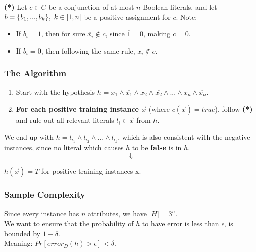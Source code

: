 \documentclass{article}
\begin{document}
	\noindent
	\textbf{(*)} Let ${c \in C}$ be a conjunction of at most ${n}$ Boolean literals, and let ${b = \{b_1,...,b_k\}, \thickspace k \in [1,n]}$ be a positive assignment for ${c}$. Note:
	\begin{itemize}
		\item If ${b_i = 1}$, then for sure ${\overline{x_i} \not \in c}$, since ${\overline{1} = 0}$, making ${c = 0}$.
		\item If ${b_i = 0}$, then following the same rule, ${x_i \not \in c}$.
	\end{itemize}
	
	\subsubsection*{The Algorithm}
	\begin{enumerate}
		\item Start with the hypothesis ${h = x_1\land \overline{x_1}\land x_2 \land \overline{x_2}\land ... \land x_n \land \overline{x_n}}$.
		
		\item \textbf{For each positive training instance ${\overrightarrow{x}}$} (where ${c(\overrightarrow{x}) = true}$), follow \textbf{(*)} and rule out all relevant literals ${l_i \in \overrightarrow{x}}$ from ${h}$.
	\end{enumerate}

	\noindent
	We end up with ${h = l_{i_1} \land l_{i_2} \land ... \land l_{i_k}}$, which is also consistent with the negative instances, since no literal which causes ${h}$ to be \textbf{false} is in ${h}$.\\
	$${\Downarrow}$$
	\begin{center}
			${h(\overrightarrow{x}) = T}$ for positive training instances x.
	\end{center}
	
	\subsubsection*{Sample Complexity}
	Since every instance has ${n}$ attributes, we have ${|H| = 3^n}$.\\
	We want to ensure that the probability of ${h}$ to have error is less than ${\epsilon}$, is bounded by ${1 - \delta}$.\\
	Meaning: ${Prֿֿ\left[error_D(h) > \epsilon\right] < \delta}$.\\
	
\end{document}
